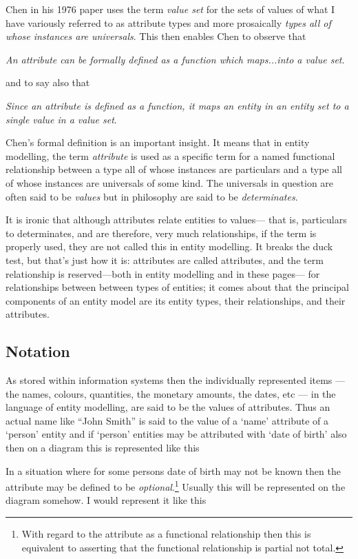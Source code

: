 \mynote
Chen in his  1976 paper uses the term \textit{value set} for the sets of values of what I have variously
referred to as attribute types and more prosaically \textit{types all of whose instances are universals}.
This then enables Chen to observe that 
\begin{erquote}
\textit{An attribute can be formally defined as a function which maps...into a value set}.
\end{erquote}
 and to say also that
 \begin{erquote}
 \textit{Since an attribute is defined as a function, it maps an entity in an entity
set to a single value in a value set}.
\end{erquote}

\mynote
Chen's formal definition is an important insight.
It means that in entity modelling, the term \textit{attribute} is used as a specific term
for a named functional relationship between a type all of whose instances are particulars  and a type all of whose instances are universals of some kind.
The universals in question are often said to be \textit{values} but 
in philosophy  are said to be \textit{determinates}. 

\mynote
It is ironic that although attributes relate entities to values—
that is, particulars to determinates, and are therefore, very much relationships, if the term is properly used, 
they are not called this in entity modelling.
It breaks the duck test, but that's just how it is:
attributes are called attributes,
and the term relationship is reserved---both in entity modelling and in these pages---
for relationships between between types of entities;
it comes about that the principal components of an entity model are its entity types,
their relationships, and their attributes.

\subsection{Notation}
\mynote  As stored within information systems
then the individually represented items --- the 
names, colours, quantities, the monetary amounts, the dates, etc --- in the language 
of entity modelling, are said to be the values of attributes. Thus an actual name 
like ``John Smith'' is said to the value of a ‘name’ attribute of a ‘person’ entity and if 
`person' entities may be attributed with ‘date of birth’ also
then on a diagram this is represented like this

\mynote 
In a situation where for some persons date of birth may not be known then the attribute
may be defined to be \textit{optional}.\footnote{With regard to the attribute as a functional relationship
then this is equivalent to asserting that the functional relationship is partial not total.}
Usually this will be represented on the diagram somehow. I would represent it like this

